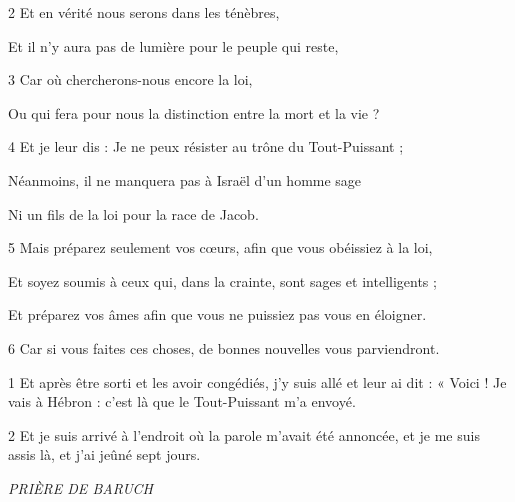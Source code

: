 \par 2 Et en vérité nous serons dans les ténèbres,

\par Et il n'y aura pas de lumière pour le peuple qui reste,

\par 3 Car où chercherons-nous encore la loi,

\par Ou qui fera pour nous la distinction entre la mort et la vie ?

\par 4 Et je leur dis : Je ne peux résister au trône du Tout-Puissant ;

\par Néanmoins, il ne manquera pas à Israël d'un homme sage

\par Ni un fils de la loi pour la race de Jacob.

\par 5 Mais préparez seulement vos cœurs, afin que vous obéissiez à la loi,

\par Et soyez soumis à ceux qui, dans la crainte, sont sages et intelligents ;

\par Et préparez vos âmes afin que vous ne puissiez pas vous en éloigner.

\par 6 Car si vous faites ces choses, de bonnes nouvelles vous parviendront.

\par [Dont je vous ai déjà parlé ; et vous ne tomberez pas dans le tourment dont je vous ai déjà témoigné.

\par 7 Mais quant à la parole selon laquelle je devais être emmené, je ne l'ai pas fait savoir à eux ni à mon fils.]


\par 1 Et après être sorti et les avoir congédiés, j'y suis allé et leur ai dit : « Voici ! Je vais à Hébron : c'est là que le Tout-Puissant m'a envoyé.

\par 2 Et je suis arrivé à l'endroit où la parole m'avait été annoncée, et je me suis assis là, et j'ai jeûné sept jours.


\par \textit{PRIÈRE DE BARUCH}

